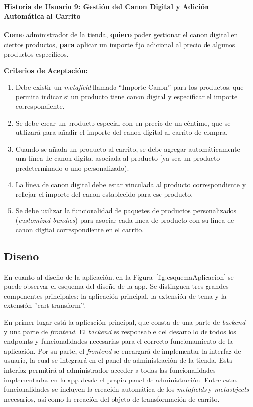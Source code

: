 \documentclass[11pt]{article}
\newcommand{\subsubsubsection}[1]{\paragraph{#1}}
\begin{document}
\subsubsubsection{Historia de Usuario 9: Gestión del Canon Digital y Adición Automática al Carrito}\label{sec:historia9}

\textbf{Como} administrador de la tienda,
\textbf{quiero} poder gestionar el canon digital en ciertos productos,
\textbf{para} aplicar un importe fijo adicional al precio de algunos productos específicos.

\vspace{0.5cm}
\textbf{Criterios de Aceptación:}
\begin{enumerate}[label=\arabic*.]
    \item Debe existir un \textit{metafield} llamado ``Importe Canon'' para los productos, que permita indicar si un producto tiene canon digital y especificar el importe correspondiente.
    \item Se debe crear un producto especial con un precio de un céntimo, que se utilizará para añadir el importe del canon digital al carrito de compra.
    \item Cuando se añada un producto al carrito, se debe agregar automáticamente una línea de canon digital asociada al producto (ya sea un producto predeterminado o uno personalizado).
    \item La línea de canon digital debe estar vinculada al producto correspondiente y reflejar el importe del canon establecido para ese producto.
    \item Se debe utilizar la funcionalidad de paquetes de productos personalizados (\textit{customized bundles}) para asociar cada línea de producto con su línea de canon digital correspondiente en el carrito.
\end{enumerate}

\clearpage
\subsection{Diseño}

En cuanto al diseño de la aplicación, en la Figura~\ref{fig:esquemaAplicacion} se puede observar el esquema del diseño de la app.
Se distinguen tres grandes componentes principales: la aplicación principal, la extensión de tema y la extensión ``cart-transform''.

En primer lugar está la aplicación principal, que consta de una parte de \textit{backend} y una parte de \textit{frontend}.
El \textit{backend} es responsable del desarrollo de todos los endpoints y funcionalidades necesarias para el correcto 
funcionamiento de la aplicación. Por su parte, el \textit{frontend} se encargará de implementar la interfaz de usuario, 
la cual se integrará en el panel de administración de la tienda. Esta interfaz permitirá al administrador acceder 
a todas las funcionalidades implementadas en la app desde el propio panel de administración. Entre estas funcionalidades 
se incluyen la creación automática de los \textit{metafields} y \textit{metaobjects} necesarios, así como la creación del objeto de transformación de carrito.
\end{document}
